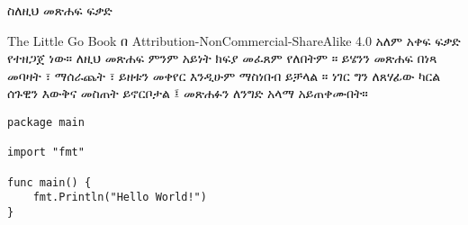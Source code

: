 \documentclass[12pt,a4paper]{book}
\begin{document}
\huge ስለዚህ መጽሐፍ
\normalsize
\hline
\vskip 0.5in
\huge ፍቃድ
\normalsize

The Little Go Book  በ Attribution-NonCommercial-ShareAlike 4.0 አለም አቀፍ ፍቃድ የተዘጋጀ ነው። ለዚህ መጽሐፍ ምንም አይነት ክፍያ መፈጸም የለበትም ። ይሄንን መጽሐፍ በነጻ መባዛት ፣ ማሰራጨት ፣ ይዘቱን መቀየር እንዲሁም ማስነበብ ይቻላል ። ነገር ግን ለጸሃፊው ካርል ሰጉዊን እውቅና መስጠት ይኖርቦታል ፤ መጽሐፉን ለንግድ አላማ አይጠቀሙበት።



\begin{lstlisting}
package main

import "fmt"

func main() {
    fmt.Println("Hello World!")
}
\end{lstlisting}
\end{document}
